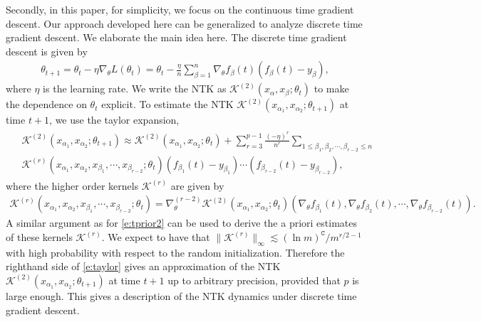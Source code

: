 \documentclass{article}
\numberwithin{equation}{section}
\newcommand{\fC}{{\mathtt C}}
\newcommand{\al}{\alpha}
\renewcommand{\leq}{\leqslant}
\newcommand{\1}{\mathds{1}}
\theoremstyle{plain} %
\begin{document}
Secondly, in this paper, for simplicity, we focus on the continuous time gradient descent. Our approach developed here can be generalized to analyze discrete time gradient descent. We elaborate the main idea here. The discrete time gradient descent is given by
\begin{align*}
\theta_{t+1}=\theta_t-\eta \nabla_\theta L(\theta_t)
=\theta_t-\frac{\eta}{n}\sum_{\beta=1}^n \nabla_\theta f_\beta(t)(f_\beta(t)-y_\beta),
\end{align*}
where $\eta$ is the learning rate. We write the NTK as ${\mathcal K}^{(2)}(x_\al, x_\beta;\theta_t)$ to make the dependence on $\theta_t$ explicit. To estimate the NTK ${\mathcal K}^{(2)}(x_{\al_1}, x_{\al_2};\theta_{t+1})$ at time $t+1$, we use the taylor expansion,
\begin{align}\begin{split}\label{e:taylor}
&{\mathcal K}^{(2)}(x_{\al_1}, x_{\al_2};\theta_{t+1})
\approx {\mathcal K}^{(2)}(x_{\al_1}, x_{\al_2};\theta_{t})+\sum_{r=3}^{p-1}\frac{(-\eta)^r}{n^r}\sum_{1\leq \beta_1,\beta_2,\cdots,\beta_{r-2}\leq n}\\
&{\mathcal K}^{(r)}(x_{\al_1}, x_{\al_2}, x_{\beta_1}, \cdots,x_{\beta_{r-2}};\theta_{t})
(f_{\beta_1}(t)-y_{\beta_1})\cdots (f_{\beta_{r-2}}(t)-y_{\beta_{r-2}}),
\end{split}\end{align}
where the higher order kernels $\mathcal K^{(r)}$ are given by
\begin{align*}
{\mathcal K}^{(r)}(x_{\al_1}, x_{\al_2}, x_{\beta_1}, \cdots,x_{\beta_{r-2}};\theta_t)
=\nabla_\theta^{(r-2)}{\mathcal K}^{(2)}(x_{\al_1}, x_{\al_2};\theta_t)(\nabla_\theta f_{\beta_1}(t), \nabla_\theta f_{\beta_2}(t),\cdots, \nabla_\theta f_{\beta_{r-2}}(t)).
\end{align*}
A similar argument as for \eqref{e:tprior2} can be used to derive the a priori estimates of these kernels $\mathcal K^{(r)}$. We expect to have that $\|\mathcal K^{(r)}\|_\infty\lesssim (\ln m)^\fC/m^{r/2-1}$ with high probability with respect to the random initialization. Therefore the righthand side of \eqref{e:taylor} gives an approximation of the NTK ${\mathcal K}^{(2)}(x_{\al_1}, x_{\al_2};\theta_{t+1})$ at time $t+1$ up to arbitrary precision, provided that $p$ is large enough. This gives a description of the NTK dynamics under discrete time gradient descent.
\end{document}
